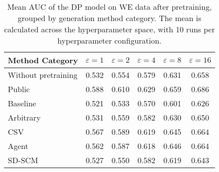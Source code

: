 \begin{table}[h!]
    \centering
    \caption{Mean AUC of the DP model on WE data after pretraining, grouped by generation method category. The mean is calculated across the hyperparameter space, with 10 runs per hyperparameter configuration.}
    \label{tab:epsilon_comparison}
    \begin{tabular}{lccccc}
    \toprule
    Method Category & $\varepsilon=1$ & $\varepsilon=2$ & $\varepsilon=4$ & $\varepsilon=8$ & $\varepsilon=16$ \\
    \midrule
    Without pretraining & 0.532 & 0.554 & 0.579 & 0.631 & \cellcolor{bronze!30}0.658 \\
    \arrayrulecolor{black!50!}\midrule
    Public & \cellcolor{gold!30}0.588 & \cellcolor{gold!30}0.610 & \cellcolor{gold!30}0.629 & \cellcolor{gold!30}0.659 & \cellcolor{gold!30}0.686 \\
    \arrayrulecolor{black!50!}\midrule
    Baseline & 0.521 & 0.533 & 0.570 & 0.601 & 0.626 \\
    \arrayrulecolor{black!50!}\midrule
    Arbitrary & 0.531 & 0.559 & 0.582 & 0.630 & 0.650 \\
    \arrayrulecolor{black!50!}\midrule
    CSV & \cellcolor{silver!30}0.567 & \cellcolor{silver!30}0.589 & \cellcolor{silver!30}0.619 & \cellcolor{bronze!30}0.645 & \cellcolor{silver!30}0.664 \\
    Agent & \cellcolor{bronze!30}0.562 & \cellcolor{bronze!30}0.587 & \cellcolor{bronze!30}0.618 & \cellcolor{silver!30}0.646 & \cellcolor{silver!30}0.664 \\
    SD-SCM & 0.527 & 0.550 & 0.582 & 0.619 & 0.643 \\
    \bottomrule
    \end{tabular}
\end{table}